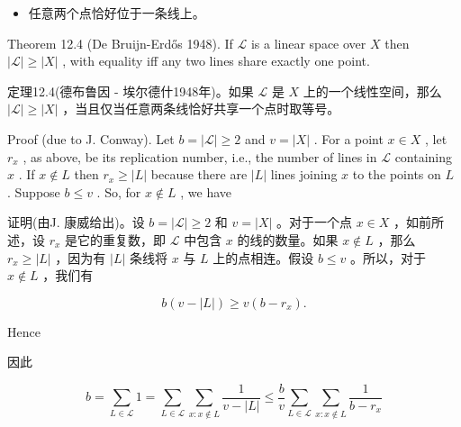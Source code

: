 \documentclass[10pt]{article}
\begin{document}
\begin{tcolorbox}\relax
\begin{itemize}\relax
\item\relax 任意两个点恰好位于一条线上。
\end{itemize}
\end{tcolorbox}

Theorem 12.4 (De Bruijn-Erdős 1948). If \(\mathcal{L}\) is a linear space over \(X\) then \(\left| \mathcal{L}\right|  \geq  \left| X\right|\) , with equality iff any two lines share exactly one point.

\begin{tcolorbox}\relax
定理12.4(德布鲁因 - 埃尔德什1948年)。如果 \(\mathcal{L}\) 是 \(X\) 上的一个线性空间，那么 \(\left| \mathcal{L}\right|  \geq  \left| X\right|\) ，当且仅当任意两条线恰好共享一个点时取等号。
\end{tcolorbox}

Proof (due to J. Conway). Let \(b = \left| \mathcal{L}\right|  \geq  2\) and \(v = \left| X\right|\) . For a point \(x \in  X\) , let \({r}_{x}\) , as above, be its replication number, i.e., the number of lines in \(\mathcal{L}\) containing \(x\) . If \(x \notin  L\) then \({r}_{x} \geq  \left| L\right|\) because there are \(\left| L\right|\) lines joining \(x\) to the points on \(L\) . Suppose \(b \leq  v\) . So, for \(x \notin  L\) , we have

\begin{tcolorbox}\relax
证明(由J. 康威给出)。设 \(b = \left| \mathcal{L}\right|  \geq  2\) 和 \(v = \left| X\right|\) 。对于一个点 \(x \in  X\) ，如前所述，设 \({r}_{x}\) 是它的重复数，即 \(\mathcal{L}\) 中包含 \(x\) 的线的数量。如果 \(x \notin  L\) ，那么 \({r}_{x} \geq  \left| L\right|\) ，因为有 \(\left| L\right|\) 条线将 \(x\) 与 \(L\) 上的点相连。假设 \(b \leq  v\) 。所以，对于 \(x \notin  L\) ，我们有
\end{tcolorbox}

\[
b\left( {v - \left| L\right| }\right)  \geq  v\left( {b - {r}_{x}}\right) .
\]

Hence

\begin{tcolorbox}\relax
因此
\end{tcolorbox}

\[
b = \mathop{\sum }\limits_{{L \in  \mathcal{L}}}1 = \mathop{\sum }\limits_{{L \in  \mathcal{L}}}\mathop{\sum }\limits_{{x : x \notin  L}}\frac{1}{v - \left| L\right| } \leq  \frac{b}{v}\mathop{\sum }\limits_{{L \in  \mathcal{L}}}\mathop{\sum }\limits_{{x : x \notin  L}}\frac{1}{b - {r}_{x}}
\]
\end{document}
